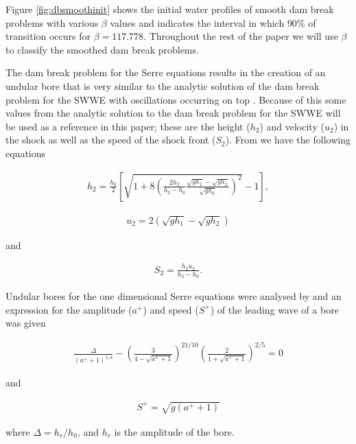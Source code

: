 \documentclass[SingleSpace,12pt,Journal]{Serre_ASCE}
\begin{document}
%
Figure \ref{fig:dbsmoothinit} shows the initial water profiles of smooth dam break problems with various $\beta$ values and indicates the interval in which $90\%$ of transition occurs for $\beta = 117.778$. Throughout the rest of the paper we will use $\beta$ to classify the smoothed dam break problems.

The dam break problem for the Serre equations results in the creation of an undular bore that is very similar to the analytic solution of the dam break problem for the SWWE with oscillations occurring on top \cite{Hank-etal-2010-2034}. Because of this some values from the analytic solution to the dam break problem for the SWWE will be used as a reference in this paper; these are the height ($h_2$) and velocity ($u_2$) in the shock as well as the speed of the shock front ($S_2$).  From  we have the following equations
\begin{linenomath*}
\begin{gather}
h_2 = \frac{h_0}{2} \left[\sqrt{1 + 8 \left(\frac{2h_2}{h_2 - h_0}\frac{\sqrt{gh_1} - \sqrt{gh_2}}{\sqrt{gh_0}}\right)^2} - 1\right],
\label{eq:h2def}
\end{gather}
\end{linenomath*}
\begin{linenomath*}
\begin{gather}
u_2 = 2\left(\sqrt{gh_1} - \sqrt{gh_2}\right)
\label{eq:u2def}
\end{gather}
\end{linenomath*}
and
\begin{linenomath*}
\begin{gather}
S_2 = \frac{h_2 u_2}{h_2 - h_0}.
\label{eq:S2def}
\end{gather}
\end{linenomath*}


Undular bores for the one dimensional Serre equations were analysed by  and an expression for the amplitude ($a^+$) and speed ($S^+$) of the leading wave of a bore was given
\begin{linenomath*}
\begin{gather}
\frac{\Delta}{\left(a^+ + 1\right)^{1/4}} - \left(\frac{3}{4 -  \sqrt{a^+ + 1}}\right)^{21/10} \left(\frac{2}{1 + \sqrt{a^+ + 1}}\right)^{2/5} = 0
\label{eq:aplusdef}
\end{gather}
\end{linenomath*}
and
\begin{linenomath*}
\begin{gather}
S^+ = \sqrt{g \left(a^+ + 1\right)}
\label{eq:splusdef}
\end{gather}
\end{linenomath*}
where $\Delta = h_r / h_0$, and $h_r$ is the amplitude of the bore.
\end{document}
